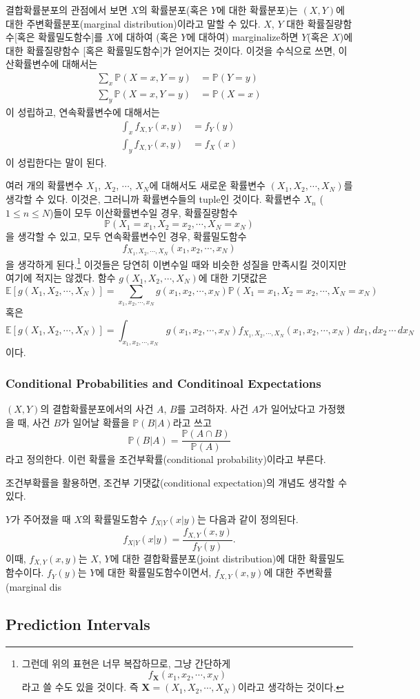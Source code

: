 \documentclass{article}
\begin{document}
결합확률분포의 관점에서 보면 \(X\)의 확률분포(혹은 \(Y\)에 대한 확률분포)는 \((X,Y)\)에 대한 주변확률분포(marginal distribution)이라고 말할 수 있다.
\(X\), \(Y\) 대한 확률질량함수[혹은 확률밀도함수]를 \(X\)에 대하여 (혹은 \(Y\)에 대하여) marginalize하면 \(Y\)(혹은 \(X\))에 대한 확률질량함수 [혹은 확률밀도함수]가 얻어지는 것이다.
이것을 수식으로 쓰면, 이산확률변수에 대해서는
\begin{align*}
\sum_x\mathbb P(X=x,Y=y)&=\mathbb P(Y=y)\\
\sum_y\mathbb P(X=x,Y=y)&=\mathbb P(X=x)
\end{align*}
이 성립하고, 연속확률변수에 대해서는
\begin{align*}
\int_xf_{X,Y}(x,y)&=f_Y(y)\\
\int_yf_{X,Y}(x,y)&=f_X(x)
\end{align*}
이 성립한다는 말이 된다.

여러 개의 확률변수 \(X_1\), \(X_2\), \(\cdots\), \(X_N\)에 대해서도 새로운 확률변수 \((X_1,X_2,\cdots,X_N)\)를 생각할 수 있다.
이것은, 그러니까 확률변수들의 tuple인 것이다.
확률변수 \(X_n\) (\(1\le n\le N\))들이 모두 이산확률변수일 경우, 확률질량함수
\[\mathbb P(X_1=x_1,X_2=x_2,\cdots,X_N=x_N)\]
을 생각할 수 있고, 모두 연속확률변수인 경우, 확률밀도함수
\[f_{X_1,X_2,\cdots,X_N}(x_1,x_2,\cdots,x_N)\]
을 생각하게 된다.\footnote{
그런데 위의 표현은 너무 복잡하므로, 그냥 간단하게
\[f_{\boldsymbol X}(x_1,x_2,\cdots,x_N)\]
라고 쓸 수도 있을 것이다.
즉 \(\boldsymbol X=(X_1,X_2,\cdots,X_N)\)이라고 생각하는 것이다.}
이것들은 당연히 이변수일 때와 비슷한 성질을 만족시킬 것이지만 여기에 적지는 않겠다.
함수 \(g(X_1,X_2,\cdots,X_N)\)에 대한 기댓값은
\[\mathbb E[g(X_1,X_2,\cdots,X_N)]=\sum_{x_1,x_2,\cdots,x_N}g(x_1,x_2,\cdots,x_N)\mathbb P(X_1=x_1,X_2=x_2,\cdots,X_N=x_N)\]
혹은
\[\mathbb E[g(X_1,X_2,\cdots,X_N)]=\int_{x_1,x_2,\cdots,x_N}g(x_1,x_2,\cdots,x_N)f_{X_1,X_2,\cdots,X_N}(x_1,x_2,\cdots,x_N)\,dx_1,dx_2\,\cdots\,dx_N\]
이다.

%
\subsubsection{Conditional Probabilities and Conditinoal Expectations}

\((X,Y)\)의 결합확률분포에서의 사건 \(A\), \(B\)를 고려하자.
사건 \(A\)가 일어났다고 가정했을 때, 사건 \(B\)가 일어날 확률을 \(\mathbb P(B|A)\)라고 쓰고
\[\mathbb P(B|A)=\frac{\mathbb P(A\cap B)}{\mathbb P(A)}\]
라고 정의한다.
이런 확률을 조건부확률(conditional probability)이라고 부른다.

조건부확률을 활용하면, 조건부 기댓값(conditional expectation)의 개념도 생각할 수 있다.


\(Y\)가 주어졌을 때 \(X\)의 확률밀도함수 \(f_{X|Y}(x|y)\)는 다음과 같이 정의된다.
\[f_{X|Y}(x|y)=\frac{f_{X,Y}(x,y)}{f_Y(y)}.\]
이때, \(f_{X,Y}(x,y)\)는 \(X\), \(Y\)에 대한 결합확률분포(joint distribution)에 대한 확률밀도함수이다.
\(f_Y(y)\)는 \(Y\)에 대한 확률밀도함수이면서,  \(f_{X,Y}(x,y)\)에 대한 주변확률(marginal dis

%
\subsection{Prediction Intervals}
\end{document}
